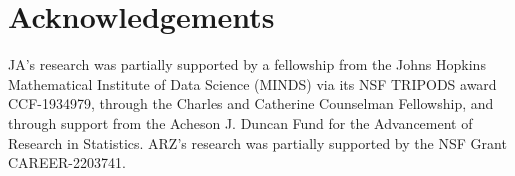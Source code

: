 \documentclass[10pt]{article}
\newcommand{\0}{{\mathbf{0}}}
\newcommand{\1}{{\mathbf{1}}}
\begin{document}
\section*{Acknowledgements}
JA’s research was partially supported by a fellowship from the Johns Hopkins Mathematical Institute of Data Science (MINDS) via its NSF TRIPODS award CCF-1934979, through the Charles and Catherine Counselman Fellowship, and through support from the Acheson J. Duncan Fund for the Advancement of Research in Statistics. ARZ's research was partially supported by the NSF Grant CAREER-2203741.









\end{document}
